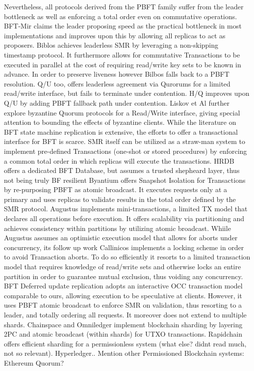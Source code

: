 Nevertheless, all protocols derived from the PBFT family suffer from the leader bottleneck as well as enforcing a total order even on commutative operations. BFT-Mir claims the leader proposing speed as the practical bottleneck in most implementations and improves upon this by allowing all replicas to act as proposers.
Biblos achieves leaderless SMR by leveraging a non-skipping timestamp protocol. It furthermore allows for commutative Transactions to be executed in parallel at the cost of requiring read/write key sets to be known in advance. In order to preserve liveness however Bilbos falls back to a PBFT resolution. Q/U too, offers leaderless agreement via Qurorums for a limited read/write interface, but fails to terminate under contention. H/Q improves upon Q/U by adding PBFT fallback path under contention. Liskov et Al further explore byzantine Quorum protocols for a Read/Write interface, giving special attention to bounding the effects of byzantine clients. 
While the literature on BFT state machine replication is extensive, the efforts to offer a transactional interface for BFT is scarce. SMR itself can be utilized as a straw-man system to implement pre-defined Transactions (one-shot or stored procedures) by enforcing a common total order  in which replicas will execute the transactions. 
HRDB offers a dedicated BFT Database, but assumes a trusted shepheard layer, thus not being truly BF resilient
Byantium offers Snapshot Isolation for Transactions by re-purposing PBFT as atomic broadcast. It executes requests only at a primary and uses replicas to validate results in the total order defined by the SMR protocol. Augustus implements mini-transactions, a limited TX model that declares all operations before execution. It offers scalability via partitioning and achieves consistency within partitions by utilizing atomic broadcast. Whiile Augustus assumes an optimistic execution model that allows for aborts under concurrency, its follow up work Callinicos implements a locking scheme in order to avoid Transaction aborts. To do so efficiently it resorts to a limited transaction model that requires knowledge of read/write sets and otherwise locks an entire partition in order to guarantee mutual exclusion, thus voiding any concurrency. BFT Deferred update replication adopts an interactive OCC transaction model comparable to ours, allowing execution to be speculative at clients. However, it uses PBFT atomic broadcast to enforce SMR on validation, thus resorting to a leader, and totally ordering all requests. It moreover does not extend to multiple shards.
Chainspace and Omniledger implement blockchain sharding by layering 2PC and atomic broadcast (within shards) for UTXO transactions. Rapidchain offers efficient sharding for a permissionless system (what else? didnt read much, not so relevant). Hyperledger.. Mention other Permissioned Blockchain systems: Ethereum Quorum?

\cite{kotla2007zyzzyva}
